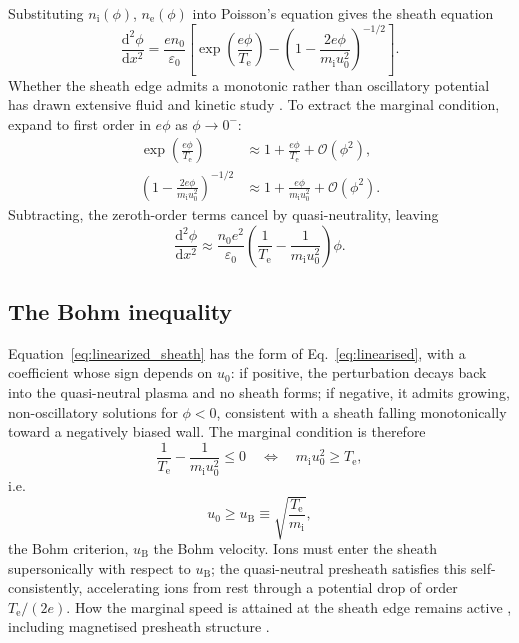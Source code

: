 Substituting $n_{\mathrm{i}}(\phi)$, $n_{\mathrm{e}}(\phi)$ into Poisson's equation gives the sheath equation
\begin{equation}
\frac{\mathrm{d}^{2}\phi}{\mathrm{d}x^{2}} = \frac{en_{0}}{\varepsilon_{0}}\left[\exp\!\left(\frac{e\phi}{T_{\mathrm{e}}}\right) - \left(1 - \frac{2e\phi}{m_{\mathrm{i}}u_{0}^{2}}\right)^{-1/2}\right].
\label{eq:sheath_eq}
\end{equation}
Whether the sheath edge admits a monotonic rather than oscillatory potential has drawn extensive fluid and kinetic study \cite{ref0665,ref0666}. To extract the marginal condition, expand to first order in $e\phi$ as $\phi \to 0^{-}$:
\begin{align}
\exp\!\left(\frac{e\phi}{T_{\mathrm{e}}}\right) &\approx 1 + \frac{e\phi}{T_{\mathrm{e}}} + \mathcal{O}(\phi^{2}), \\
\left(1 - \frac{2e\phi}{m_{\mathrm{i}}u_{0}^{2}}\right)^{-1/2} &\approx 1 + \frac{e\phi}{m_{\mathrm{i}}u_{0}^{2}} + \mathcal{O}(\phi^{2}).
\end{align}
Subtracting, the zeroth-order terms cancel by quasi-neutrality, leaving
\begin{equation}
\frac{\mathrm{d}^{2}\phi}{\mathrm{d}x^{2}} \approx \frac{n_{0}e^{2}}{\varepsilon_{0}}\left(\frac{1}{T_{\mathrm{e}}} - \frac{1}{m_{\mathrm{i}}u_{0}^{2}}\right)\phi.
\label{eq:linearized_sheath}
\end{equation}

\subsection{The Bohm inequality}

Equation~\eqref{eq:linearized_sheath} has the form of Eq.~\eqref{eq:linearised}, with a coefficient whose sign depends on $u_{0}$: if positive, the perturbation decays back into the quasi-neutral plasma and no sheath forms; if negative, it admits growing, non-oscillatory solutions for $\phi<0$, consistent with a sheath falling monotonically toward a negatively biased wall. The marginal condition is therefore
\begin{equation}
\frac{1}{T_{\mathrm{e}}} - \frac{1}{m_{\mathrm{i}}u_{0}^{2}} \le 0
\quad\Longleftrightarrow\quad
m_{\mathrm{i}}u_{0}^{2} \ge T_{\mathrm{e}},
\end{equation}
i.e.
\begin{equation}
\boxed{u_{0} \ge u_{\mathrm{B}} \equiv \sqrt{\frac{T_{\mathrm{e}}}{m_{\mathrm{i}}}}},
\label{appA-eq:bohm}
\end{equation}
the Bohm criterion, $u_{\mathrm{B}}$ the Bohm velocity. Ions must enter the sheath supersonically with respect to $u_{\mathrm{B}}$; the quasi-neutral presheath satisfies this self-consistently, accelerating ions from rest through a potential drop of order $T_{\mathrm{e}}/(2e)$. How the marginal speed is attained at the sheath edge remains active \cite{ref0004}, including magnetised presheath structure \cite{ref0017}.

